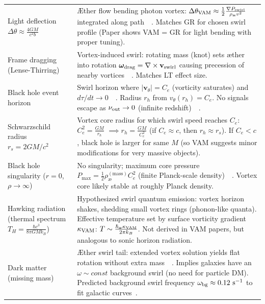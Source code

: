 \documentclass[a4paper,12pt]{article}
\begin{document}
\begin{table}[H]
\begin{tabular}{p{} | p{}}
            Light deflection $\Delta\theta \approx \frac{4GM}{c^2 b}$ & Æther flow bending photon vortex: $\Delta \theta_{\rm VAM} \approx \frac{1}{2} \frac{\nabla P_{\rm swirl}}{\rho_{\text{\ae}} v^2}$ integrated along path~\cite{reference_218}~\cite{reference_219}. Matches GR for chosen swirl profile (Paper shows VAM = GR for light bending with proper tuning). \\
            Frame dragging (Lense-Thirring) & Vortex-induced swirl: rotating mass (knot) sets æther into rotation $\boldsymbol{\omega}_{\rm drag} = \nabla \times \mathbf{v}_{\rm swirl}$ causing precession of nearby vortices~\cite{reference_220}~\cite{reference_221}. Matches LT effect size. \\
            Black hole event horizon & Swirl horizon where $|\mathbf{v}_\theta| = C_e$ (vorticity saturates) and $d\tau/dt \to 0$~\cite{reference_222}~\cite{reference_223}. Radius $r_h$ from $v_\theta(r_h)=C_e$. No signals escape as $\nu_{\rm out}\to 0$ (infinite redshift)~\cite{reference_224}~\cite{reference_225}. \\
            Schwarzschild radius $r_s = 2GM/c^2$ & Vortex core radius for which swirl speed reaches $C_e$: $C_e^2 = \frac{GM}{r_h}$ $\implies r_h = \frac{GM}{C_e^2}$ (if $C_e \approx c$, then $r_h \approx r_s$). If $C_e < c$, black hole is larger for same $M$ (so VAM suggests minor modifications for very massive objects). \\
            Black hole singularity ($r=0$, $\rho\to\infty$) & No singularity; maximum core pressure $P_{\max} = \frac{1}{2}\rho_{\text{\ae}}^{(\text{mass})}C_e^2$ (finite Planck-scale density)~\cite{reference_226}~\cite{reference_227}. Vortex core likely stable at roughly Planck density. \\
            Hawking radiation (thermal spectrum $T_H = \frac{\hbar c^3}{8\pi GMk_B}$) & Hypothesized swirl quantum emission: vortex horizon shakes, shedding small vortex rings (phonon-like quanta). Effective temperature set by surface vorticity gradient $\kappa_{\rm VAM}$: $T \sim \frac{\hbar_{\text{\ae}}\kappa_{\rm VAM}}{2\pi k_B}$. Not derived in VAM papers, but analogous to sonic horizon radiation. \\
            Dark matter (missing mass) & Æther swirl tail: extended vortex solution yields flat rotation without extra mass~\cite{reference_228}~\cite{reference_229}. Implies galaxies have an $\omega \sim const$ background swirl (no need for particle DM). Predicted background swirl frequency $\omega_{\rm bg}\approx 0.12~\text{s}^{-1}$ to fit galactic curves~\cite{reference_230}. \\

\end{tabular}
\end{table}
\end{document}
